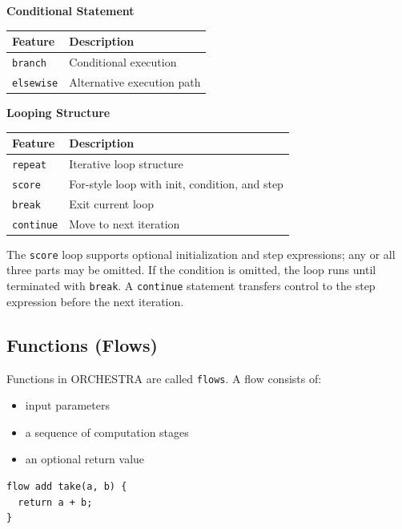 \documentclass[12pt,a4paper]{article}
\begin{document}
\textbf{Conditional Statement}

\begin{table}[H]
\centering
\begin{tabularx}{0.88\textwidth}{l X}
\toprule
\textnormal{Feature} & \textnormal{Description} \\
\midrule
\texttt{branch} & Conditional execution \\
\texttt{elsewise} & Alternative execution path \\
\bottomrule
\end{tabularx}
\end{table}

\textbf{Looping Structure}

\begin{table}[H]
\centering
\begin{tabularx}{0.88\textwidth}{l X}
\toprule
\textnormal{Feature} & \textnormal{Description} \\
\midrule
\texttt{repeat} & Iterative loop structure \\
\texttt{score} & For-style loop with init, condition, and step \\
\texttt{break} & Exit current loop \\
\texttt{continue} & Move to next iteration \\
\bottomrule
\end{tabularx}
\end{table}

The \texttt{score} loop supports optional initialization and step expressions; any or all three parts may be omitted. If the condition is omitted, the loop runs until terminated with \texttt{break}. A \texttt{continue} statement transfers control to the step expression before the next iteration.

\subsection*{Functions (Flows)}

Functions in ORCHESTRA are called \texttt{flows}. A flow consists of:

\begin{itemize}
\item input parameters
\item a sequence of computation stages
\item an optional return value
\end{itemize}

\begin{lstlisting}[style=orchestra]
flow add take(a, b) {
  return a + b;
}
\end{lstlisting}
\end{document}
